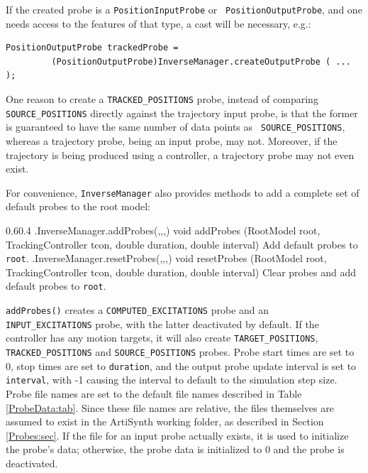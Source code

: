 If the created probe is a {\tt PositionInputProbe} or {\tt
PositionOutputProbe}, and one needs access to the features of that type, a cast
will be necessary, e.g.:
%
\begin{lstlisting}[]
      PositionOutputProbe trackedProbe = 
         (PositionOutputProbe)InverseManager.createOutputProbe ( ... );
\end{lstlisting}
%

\begin{sideblock}
One reason to create a {\tt TRACKED\_POSITIONS} probe, instead of comparing
{\tt SOURCE\_POSITIONS} directly against the trajectory input probe, is that
the former is guaranteed to have the same number of data points as {\tt
SOURCE\_POSITIONS}, whereas a trajectory probe, being an input probe, may
not. Moreover, if the trajectory is being produced using a controller,
a trajectory probe may not even exist.
\end{sideblock}

For convenience, {\tt InverseManager} also provides methods to add a complete
set of default probes to the root model:
%
\begin{methodtable}{0.6}{0.4}
\midline
%
\methodentry
{\inverse.InverseManager.addProbes(,,,)}%
{void addProbes (RootModel root, TrackingController tcon,\brh
double duration, double interval)}%
{Add default probes to {\tt root}.}%
%
\methodspace{0.5em}%
\methodentry
{\inverse.InverseManager.resetProbes(,,,)}%
{void resetProbes (RootModel root, TrackingController tcon,\brh
double duration, double interval)}%
{Clear probes and add default probes to {\tt root}.}%
%
\midline
\end{methodtable}
%
{\tt addProbes()} creates a {\tt COMPUTED\_EXCITATIONS} probe and an {\tt
INPUT\_EXCITATIONS} probe, with the latter deactivated by default.  If the
controller has any motion targets, it will also create {\tt TARGET\_POSITIONS},
{\tt TRACKED\_POSITIONS} and {\tt SOURCE\_POSITIONS} probes.  Probe start times
are set to 0, stop times are set to {\tt duration}, and the output probe update
interval is set to {\tt interval}, with -1 causing the interval to default to
the simulation step size. Probe file names are set to the default file names
described in Table \ref{ProbeData:tab}.  Since these file names are relative,
the files themselves are assumed to exist in the ArtiSynth working folder, as
described in Section \ref{Probes:sec}. If the file for an input probe actually
exists, it is used to initialize the probe's data; otherwise, the probe data is
initialized to 0 and the probe is deactivated.

